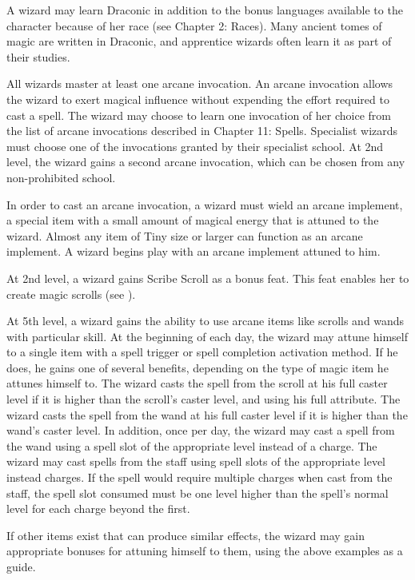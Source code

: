  A wizard may learn Draconic in addition to the bonus languages available to the character because of her race (see Chapter 2: Races). Many ancient tomes of magic are written in Draconic, and apprentice wizards often learn it as part of their studies.

 All wizards master at least one arcane invocation. An arcane invocation allows the wizard to exert magical influence without expending the effort required to cast a spell. The wizard may choose to learn one invocation of her choice from the list of arcane invocations described in Chapter 11: Spells. Specialist wizards must choose one of the invocations granted by their specialist school. At 2nd level, the wizard gains a second arcane invocation, which can be chosen from any non-prohibited school.

In order to cast an arcane invocation, a wizard must wield an arcane implement, a special item with a small amount of magical energy that is attuned to the wizard. Almost any item of Tiny size or larger can function as an arcane implement. A wizard begins play with an arcane implement attuned to him.

 At 2nd level, a wizard gains Scribe Scroll as a bonus feat. This feat enables her to create magic scrolls (see ).

 At 5th level, a wizard gains the ability to use arcane items like scrolls and wands with particular skill. At the beginning of each day, the wizard may attune himself to a single item with a spell trigger or spell completion activation method. If he does, he gains one of several benefits, depending on the type of magic item he attunes himself to.
 The wizard casts the spell from the scroll at his full caster level if it is higher than the scroll's caster level, and using his full attribute.
 The wizard casts the spell from the wand at his full caster level if it is higher than the wand's caster level. In addition, once per day, the wizard may cast a spell from the wand using a spell slot of the appropriate level instead of a charge.
 The wizard may cast spells from the staff using spell slots of the appropriate level instead charges. If the spell would require multiple charges when cast from the staff, the spell slot consumed must be one level higher than the spell's normal level for each charge beyond the first.
\par If other items exist that can produce similar effects, the wizard may gain appropriate bonuses for attuning himself to them, using the above examples as a guide.


